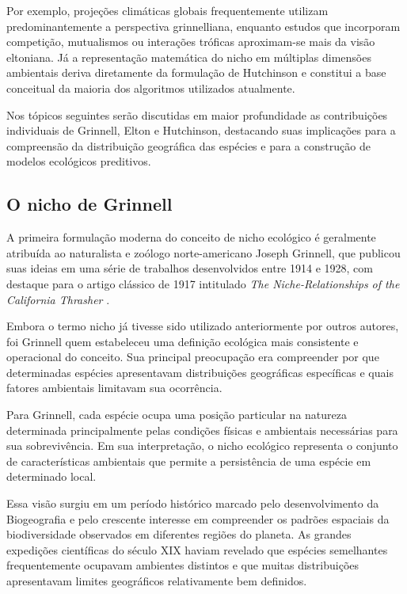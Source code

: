 Por exemplo, projeções climáticas globais frequentemente utilizam predominantemente a perspectiva grinnelliana, enquanto estudos que incorporam competição, mutualismos ou interações tróficas aproximam-se mais da visão eltoniana. Já a representação matemática do nicho em múltiplas dimensões ambientais deriva diretamente da formulação de Hutchinson e constitui a base conceitual da maioria dos algoritmos utilizados atualmente.

Nos tópicos seguintes serão discutidas em maior profundidade as contribuições individuais de Grinnell, Elton e Hutchinson, destacando suas implicações para a compreensão da distribuição geográfica das espécies e para a construção de modelos ecológicos preditivos.

\subsection{O nicho de Grinnell}

A primeira formulação moderna do conceito de nicho ecológico é geralmente atribuída ao naturalista e zoólogo norte-americano Joseph Grinnell, que publicou suas ideias em uma série de trabalhos desenvolvidos entre 1914 e 1928, com destaque para o artigo clássico de 1917 intitulado \textit{The Niche-Relationships of the California Thrasher} \parencite{grinnell1917}.

Embora o termo nicho já tivesse sido utilizado anteriormente por outros autores, foi Grinnell quem estabeleceu uma definição ecológica mais consistente e operacional do conceito. Sua principal preocupação era compreender por que determinadas espécies apresentavam distribuições geográficas específicas e quais fatores ambientais limitavam sua ocorrência.

Para Grinnell, cada espécie ocupa uma posição particular na natureza determinada principalmente pelas condições físicas e ambientais necessárias para sua sobrevivência. Em sua interpretação, o nicho ecológico representa o conjunto de características ambientais que permite a persistência de uma espécie em determinado local.

Essa visão surgiu em um período histórico marcado pelo desenvolvimento da Biogeografia e pelo crescente interesse em compreender os padrões espaciais da biodiversidade observados em diferentes regiões do planeta. As grandes expedições científicas do século XIX haviam revelado que espécies semelhantes frequentemente ocupavam ambientes distintos e que muitas distribuições apresentavam limites geográficos relativamente bem definidos.

